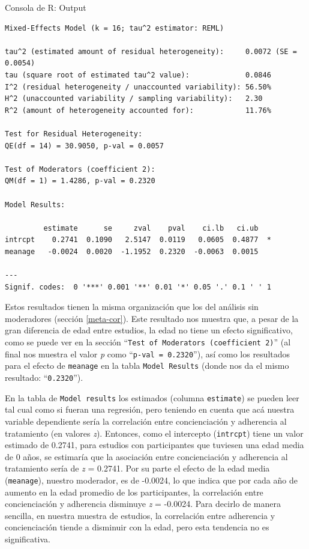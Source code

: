 \documentclass[
  bookmarksnumbered]{article}
\begin{document}
\begin{ROut}{Consola de R: Output~\thetcbcounter}
                \begin{footnotesize}
                \begin{verbatim} 
Mixed-Effects Model (k = 16; tau^2 estimator: REML)

tau^2 (estimated amount of residual heterogeneity):     0.0072 (SE = 0.0054)
tau (square root of estimated tau^2 value):             0.0846
I^2 (residual heterogeneity / unaccounted variability): 56.50%
H^2 (unaccounted variability / sampling variability):   2.30
R^2 (amount of heterogeneity accounted for):            11.76%

Test for Residual Heterogeneity:
QE(df = 14) = 30.9050, p-val = 0.0057

Test of Moderators (coefficient 2):
QM(df = 1) = 1.4286, p-val = 0.2320

Model Results:

         estimate      se     zval    pval    ci.lb   ci.ub    
intrcpt    0.2741  0.1090   2.5147  0.0119   0.0605  0.4877  * 
meanage   -0.0024  0.0020  -1.1952  0.2320  -0.0063  0.0015    

---
Signif. codes:  0 '***' 0.001 '**' 0.01 '*' 0.05 '.' 0.1 ' ' 1
 \end{verbatim}
                \end{footnotesize}
                \end{ROut}

Estos resultados tienen la misma organización que los del análisis sin moderadores (sección \ref{meta-cor}). Este resultado nos muestra que, a pesar de la gran diferencia de edad entre estudios, la edad no tiene un efecto significativo, como se puede ver en la sección ``\texttt{Test\ of\ Moderators\ (coefficient\ 2)}'' (al final nos muestra el valor \emph{p} como ``\texttt{p-val =  0.2320}''), así como los resultados para el efecto de \texttt{meanage} en la tabla \texttt{Model\ Results} (donde nos da el mismo resultado: ``\texttt{0.2320}'').

En la tabla de \texttt{Model\ results} los estimados (columna \texttt{estimate}) se pueden leer tal cual como si fueran una regresión, pero teniendo en cuenta que acá nuestra variable dependiente sería la correlación entre concienciación y adherencia al tratamiento (en valores \emph{z}). Entonces, como el intercepto (\texttt{intrcpt}) tiene un valor estimado de 0.2741, para estudios con participantes que tuviesen una edad media de 0 años, se estimaría que la asociación entre concienciación y adherencia al tratamiento sería de \emph{z} = 0.2741. Por su parte el efecto de la edad media (\texttt{meanage}), nuestro moderador, es de -0.0024, lo que indica que por cada año de aumento en la edad promedio de los participantes, la correlación entre concienciación y adherencia disminuye \emph{z} = -0.0024. Para decirlo de manera sencilla, en nuestra muestra de estudios, la correlación entre adherencia y concienciación tiende a disminuir con la edad, pero esta tendencia no es significativa.
\end{document}
